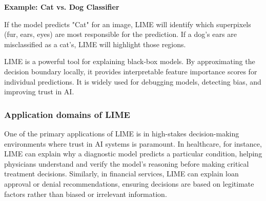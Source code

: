 \textbf{Example: Cat vs. Dog Classifier}

If the model predicts "Cat" for an image, LIME will identify which superpixels (fur, ears, eyes) are most responsible for the prediction. If a dog's ears are misclassified as a cat’s, LIME will highlight those regions.



LIME is a powerful tool for explaining black-box models. By approximating the decision boundary locally, it provides interpretable feature importance scores for individual predictions. It is widely used for debugging models, detecting bias, and improving trust in AI.

\subsubsection{Application domains of LIME}
One of the primary applications of LIME is in high-stakes decision-making environments where trust in AI systems is paramount. In healthcare, for instance, LIME can explain why a diagnostic model predicts a particular condition, helping physicians understand and verify the model's reasoning before making critical treatment decisions. Similarly, in financial services, LIME can explain loan approval or denial recommendations, ensuring decisions are based on legitimate factors rather than biased or irrelevant information. 






